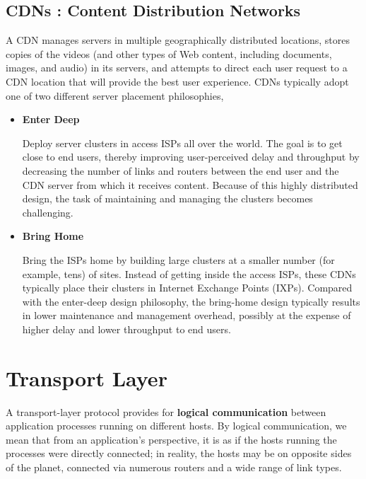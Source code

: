 \documentclass[11pt]{article}
\begin{document}
\subsection{CDNs : Content Distribution Networks}

A CDN manages servers in multiple geographically distributed locations, stores copies of the videos (and other types of Web content, including documents, images, and audio) in its servers, and attempts to direct each user request to a CDN location that will provide the best user experience. CDNs typically adopt one of two different server placement philosophies,

\begin{itemize}

	\item \textbf{Enter Deep}
	
	Deploy server clusters in access ISPs all over the world. The goal is to get close to end users, thereby improving user-perceived delay and throughput by decreasing the number of links and routers between the end user and the CDN server from which it receives content. Because of this highly distributed design, the task of maintaining and managing the clusters becomes challenging.
	
	\item \textbf{Bring Home}
	
	Bring the ISPs home by building large clusters at a smaller number (for example, tens) of sites. Instead of getting inside the access ISPs, these CDNs typically place their clusters in Internet Exchange Points (IXPs). Compared with the enter-deep design philosophy, the bring-home design typically results in lower maintenance and management overhead, possibly at the expense of higher delay and lower throughput to end users.

\end{itemize}

\section{Transport Layer}

A transport-layer protocol provides for \textbf{logical communication} between application processes running on different hosts. By logical communication, we mean that from an application’s perspective, it is as if the hosts running the processes were directly connected; in reality, the hosts may be on opposite sides of the planet, connected via numerous routers and a wide range of link types.
\end{document}
